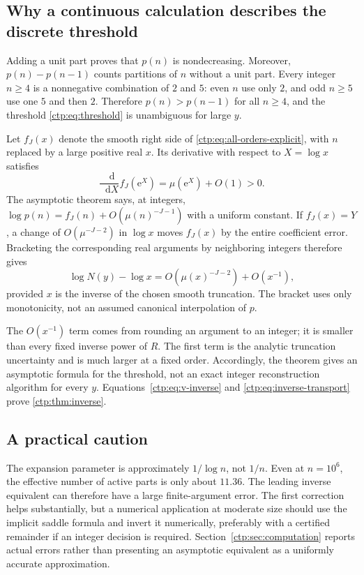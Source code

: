 \documentclass[11pt,a4paper]{article}
\numberwithin{equation}{section}
\theoremstyle{definition}
\theoremstyle{remark}
\newcommand{\e}{\mathrm e}
\newcommand{\dd}{\mathop{}\!\mathrm d}
\begin{document}
\subsection{Why a continuous calculation describes the discrete threshold}
Adding a unit part proves that $p(n)$ is nondecreasing. Moreover,
$p(n)-p(n-1)$ counts partitions of $n$ without a unit part.
Every integer $n\geq4$ is a nonnegative combination of $2$ and $5$:
even $n$ use only $2$, and odd $n\geq5$ use one $5$ and then $2$.
Therefore $p(n)>p(n-1)$ for all $n\geq4$, and the threshold
\eqref{ctp:eq:threshold} is unambiguous for large $y$.

Let $f_J(x)$ denote the smooth right side of
\eqref{ctp:eq:all-orders-explicit}, with $n$ replaced by a large positive real
$x$. Its derivative with respect to $X=\log x$ satisfies
\begin{equation}\label{ctp:eq:inverse-slope}
 \frac{\dd}{\dd X}f_J(\e^X)=\mu(\e^X)+O(1)>0.
\end{equation}
The asymptotic theorem says, at integers,
$\log p(n)=f_J(n)+O(\mu(n)^{-J-1})$ with a uniform constant.
If $f_J(x)=Y$, a change of $O(\mu^{-J-2})$ in $\log x$ moves $f_J(x)$
by the entire coefficient error. Bracketing the corresponding real
arguments by neighboring integers therefore gives
\begin{equation}\label{ctp:eq:inverse-transport}
 \log N(y)-\log x
 =O(\mu(x)^{-J-2})+O(x^{-1}),
\end{equation}
provided $x$ is the inverse of the chosen smooth truncation. The bracket
uses only monotonicity, not an assumed canonical interpolation of $p$.

The $O(x^{-1})$ term comes from rounding an argument to an integer; it is
smaller than every fixed inverse power of $R$. The first term is the
analytic truncation uncertainty and is much larger at a fixed order.
Accordingly, the theorem gives an asymptotic formula for the threshold,
not an exact integer reconstruction algorithm for every $y$.
Equations~\eqref{ctp:eq:v-inverse} and \eqref{ctp:eq:inverse-transport} prove
\cref{ctp:thm:inverse}.

\subsection{A practical caution}
The expansion parameter is approximately $1/\log n$, not $1/n$.
Even at $n=10^6$, the effective number of active parts is only about
$11.36$. The leading inverse equivalent can therefore have a large
finite-argument error. The first correction helps substantially, but a
numerical application at moderate size should use the implicit saddle
formula and invert it numerically, preferably with a certified remainder
if an integer decision is required. Section~\ref{ctp:sec:computation} reports
actual errors rather than presenting an asymptotic equivalent as a
uniformly accurate approximation.
\end{document}
